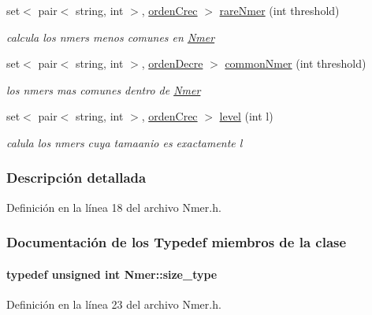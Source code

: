\begin{DoxyCompactItemize}
set$<$ pair$<$ string, int $>$, \hyperlink{classNmer_1_1ordenCrec}{orden\+Crec} $>$ \hyperlink{classNmer_ac878556843a4b401b4be0e1be6747e45}{rare\+Nmer} (int threshold)
\begin{DoxyCompactList}\small\item\em calcula los nmers menos comunes en \hyperlink{classNmer}{Nmer} \end{DoxyCompactList}\item 
set$<$ pair$<$ string, int $>$, \hyperlink{classNmer_1_1ordenDecre}{orden\+Decre} $>$ \hyperlink{classNmer_aaf801908e364dd05d7cc33c81d944b0a}{common\+Nmer} (int threshold)
\begin{DoxyCompactList}\small\item\em los nmers mas comunes dentro de \hyperlink{classNmer}{Nmer} \end{DoxyCompactList}\item 
set$<$ pair$<$ string, int $>$, \hyperlink{classNmer_1_1ordenCrec}{orden\+Crec} $>$ \hyperlink{classNmer_a38059ff69b4934e18a5c467338179761}{level} (int l)
\begin{DoxyCompactList}\small\item\em calula los nmers cuya tamaanio es exactamente l \end{DoxyCompactList}\end{DoxyCompactItemize}


\subsubsection{Descripción detallada}


Definición en la línea 18 del archivo Nmer.\+h.



\subsubsection{Documentación de los \textquotesingle{}Typedef\textquotesingle{} miembros de la clase}
\paragraph[{\texorpdfstring{size\+\_\+type}{size_type}}]{\setlength{\rightskip}{0pt plus 5cm}typedef unsigned int {\bf Nmer\+::size\+\_\+type}}\hypertarget{classNmer_a1b8892df885de3ac91edf3abd8f1b55d}{}\label{classNmer_a1b8892df885de3ac91edf3abd8f1b55d}


Definición en la línea 23 del archivo Nmer.\+h.



